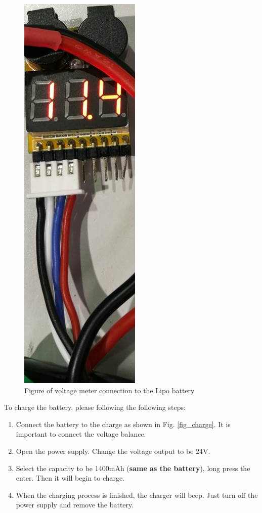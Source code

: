 \documentclass[idxtotoc,hyperref,openany]{labbook} %
\begin{document}
\begin{figure}
\centering
\includegraphics[scale=0.4]{./Figure/fig_battery}
\caption{Figure of voltage meter connection to the Lipo battery}\label{fig_battery}
\end{figure}


To charge the battery, please following the following steps:

\begin{enumerate}
\item Connect the battery to the charge as shown in Fig. \ref{fig_charge}. It is important to connect the voltage balance.
\item Open the power supply. Change the voltage output to be 24V.
\item Select the capacity to be 1400mAh (\textbf{same as the battery}), long press the enter. Then it will begin to charge. 
\item When the charging process is finished, the charger will beep. Just turn off the power supply and remove the battery. 
\end{enumerate}
\end{document}

